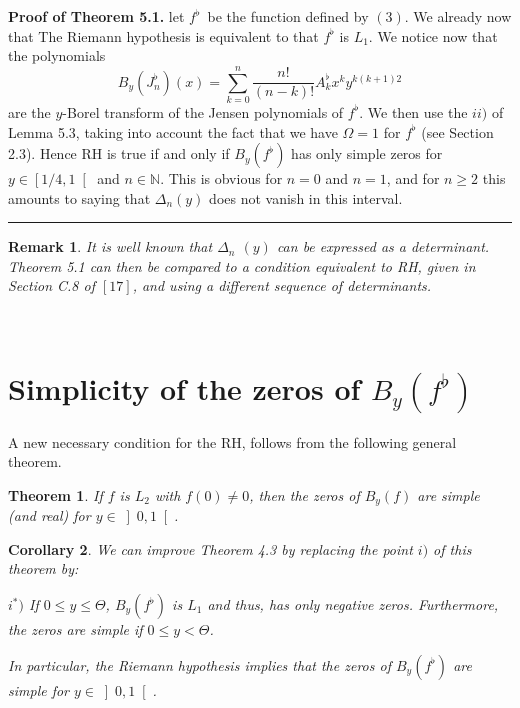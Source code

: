 \documentclass{article}
\newtheorem{theorem}{Theorem}[section]
\newtheorem{corollary}[theorem]{Corollary}
\newtheorem{remark}{Remark}
\newenvironment{proof}[1][Proof]{\textbf{#1.} }{\ \rule{0.5em}{0.5em}}
\begin{document}
\begin{proof}[Proof of Theorem 5.1]
let $f^{\flat }$\bigskip\ be the function defined by $\left( 3\right) $. We
already now that The Riemann hypothesis is equivalent to that $f^{\flat }$
is $L_{1}$. We notice now that the polynomials 
\begin{equation*}
B_{y}\left( J_{n}^{\flat }\right) \left( x\right) =\sum_{k=0}^{n}\dfrac{n!}{\left( n-k\right) !}A_{k}^{\flat }x^{k}y^{k\left( k+1\right) 2}
\end{equation*}
are the $y$-Borel transform of the Jensen polynomials of $f^{\flat }$. We
then use the $ii)$ of Lemma 5.3, taking into account the fact that we have $\Omega =1$ for $f^{\flat }$ (see Section 2.3). Hence RH is true if and only
if $B_{y}\left( f^{\flat }\right) $ has only simple zeros for $y\in \left[
1/4,1\right[ $ and $n\in \mathbb{N}$. This is obvious for $n=0$ and $n=1$,
and for $n\geq 2$ this amounts to saying that $\Delta _{n}\left( y\right) $
does not vanish in this interval.
\end{proof}

\begin{remark}
\bigskip It is well known that $\Delta _{n}$ $\left( y\right) $ can be
expressed as a determinant. Theorem 5.1 can then be compared to a condition
equivalent to RH, given in Section C.8 of $\left[ 17\right] $, and using a
different sequence of determinants.
\end{remark}

\bigskip\ 

\section{\protect\bigskip Simplicity of the zeros of $B_{y}\left( f^{\flat
}\right) $}

A new necessary condition for the RH, follows from the following general
theorem.

\begin{theorem}
If $f$ is $L_{2}$ with $f\left( 0\right) \neq 0$, then the zeros of $B_{y}\left( f\right) $ are simple (and real) for $y\in \left] 0,1\right[ $.
\end{theorem}

\bigskip

\begin{corollary}
\bigskip \bigskip We can improve Theorem 4.3 by replacing the point $i)$ of
this theorem by:

$i^{\ast })$ If $0\leq y\leq \Theta $, $B_{y}\left( f^{\flat }\right) $ is $L_{1}$ and thus, has only negative zeros. Furthermore, the zeros are simple
if $0\leq y<\Theta $.

In particular, the Riemann hypothesis implies that the zeros of $B_{y}\left(
f^{\flat }\right) $ are simple for $y\in \left] 0,1\right[ $.
\end{corollary}
\end{document}
